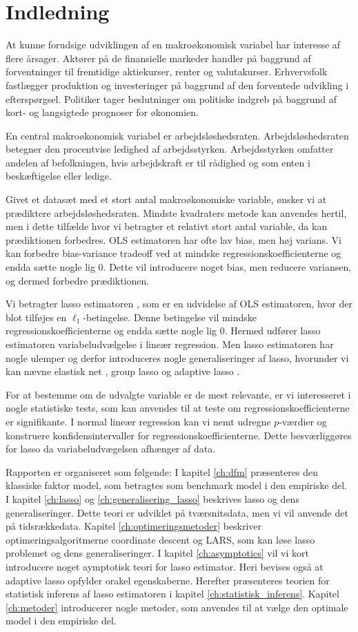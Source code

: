 \chapter{Indledning}
At kunne forudsige udviklingen af en makroøkonomisk variabel har interesse af flere årsager.
Aktører på de finansielle markeder handler på baggrund af forventninger til fremtidige aktiekurser, renter og valutakurser.
Erhvervsfolk fastlægger produktion og investeringer på baggrund af den forventede udvikling i efterspørgsel.
Politiker tager beslutninger om politiske indgreb på baggrund af kort- og langsigtede prognoser for økonomien.

En central makroøkonomisk variabel er arbejdsløshedsraten.
Arbejdsløshedsraten betegner den procentvise ledighed af arbejdsstyrken.
Arbejdsstyrken omfatter andelen af befolkningen, hvis arbejdskraft er til rådighed og som enten i beskæftigelse eller ledige.

Givet et datasæt med et stort antal makroøkonomiske variable, ønsker vi at prædiktere arbejdsløshedsraten.
Mindste kvadraters metode kan anvendes hertil, men i dette tilfælde hvor vi betragter et relativt stort antal variable, da kan prædiktionen forbedres.
OLS estimatoren har ofte lav bias, men høj varians.
Vi kan forbedre bias-variance tradeoff ved at mindske regressionskoefficienterne og endda sætte nogle lig 0.
Dette vil introducere noget bias, men reducere variansen, og dermed forbedre prædiktionen.

Vi betragter lasso estimatoren \citep{lasso}, som er en udvidelse af OLS estimatoren, hvor der blot tilføjes en \(\ell_1\)-betingelse.
Denne betingelse vil mindske regressionskoefficienterne og endda sætte nogle lig 0.
Hermed udfører lasso estimatoren variabeludvælgelse i lineær regression.
Men lasso estimatoren har nogle ulemper og derfor introduceres nogle generaliseringer af lasso, hvorunder vi kan nævne elastisk net \citep{zou_hastie}, group lasso \citep{group_lasso} og adaptive lasso \citep{adaptive_lasso}.

For at bestemme om de udvalgte variable er de mest relevante, er vi interesseret i nogle statistiske tests, som kan anvendes til at teste om regressionskoefficienterne er signifikante.
I normal lineær regression kan vi nemt udregne \(p\)-værdier og konstruere konfidensintervaller for regressionskoefficienterne.
Dette besværliggøres for lasso da variabeludvægelsen afhænger af data.


Rapporten er organiseret som følgende: 
I kapitel \ref{ch:dfm} præsenteres den klassiske faktor model, som betragtes som benchmark model i den empiriske del.
I kapitel \ref{ch:lasso} og \ref{ch:generalisering_lasso} beskrives lasso og dens generaliseringer. Dette teori er udviklet på tværsnitsdata, men vi vil anvende det på tidsrækkedata.
Kapitel \ref{ch:optimeringsmetoder} beskriver optimeringsalgoritmerne coordinate descent og LARS, som kan løse lasso problemet og dens generaliseringer.
I kapitel \ref{ch:asymptotics} vil vi kort introducere noget aymptotisk teori for lasso estimator. Heri bevises også at adaptive lasso opfylder orakel egenskaberne.
Herefter præsenteres teorien for statistisk inferens af lasso estimatoren i kapitel \ref{ch:statistisk_inferens}.
Kapitel \ref{ch:metoder} introducerer nogle metoder, som anvendes til at vælge den optimale model i den empiriske del.
